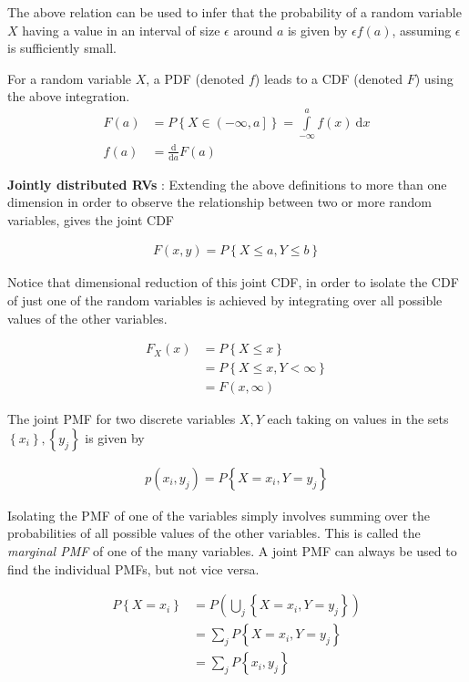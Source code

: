 The above relation can be used to infer that the probability of a random variable $ X $ having a value in an interval of size $ \epsilon $ around $ a $ is given by $ \epsilon f(a) $, assuming $ \epsilon $ is sufficiently small. 

For a random variable $ X $, a PDF (denoted $ f $) leads to a CDF (denoted $ F $) using the above integration.
\begin{align}
	F(a) &= P \left\{ X \in \left( -\infty, a \right]  \right\} = \int\limits_{-\infty}^{a} f(x) \ \mathrm{d}x \\
	f(a) &= \frac{\mathrm{d}}{\mathrm{d}a} F(a)
\end{align}

\textbf{Jointly distributed RVs} : Extending the above definitions to more than one dimension in order to observe the relationship between two or more random variables, gives the joint CDF

\begin{align}
	F(x, y) = P \left\{ X \leq a, Y \leq b \right\}
\end{align}

Notice that dimensional reduction of this joint CDF, in order to isolate the CDF of just one of the random variables is achieved by integrating over all possible values of the other variables.

\begin{align}
	F_X (x) &= P \left\{ X \leq x \right\} \nonumber \\
	&= P \left\{ X \leq x, Y < \infty \right\} \nonumber \\
	&= F(x, \infty)
\end{align}

The joint PMF for two discrete variables $ X, Y $ each taking on values in the sets $ \left\{ x_i \right\}, \left\{ y_j \right\} $ is given by

\begin{align}
	p(x_i, y_j) = P \left\{ X = x_i, Y = y_j \right\}
\end{align}

Isolating the PMF of one of the variables simply involves summing over the probabilities of all possible values of the other variables. This is called the \textit{marginal PMF} of one of the many variables. A joint PMF can always be used to find the individual PMFs, but not vice versa.

\begin{align}
	P \left\{ X = x_i \right\} &= P \left( \bigcup_{j} \left\{ X = x_i, Y = y_j \right\} \right)  \nonumber\\
	&= \sum\limits_{j} P \left\{ X = x_i, Y = y_j \right\} \nonumber\\
	&= \sum\limits_{j} P \left\{x_i,y_j \right\}
\end{align}

